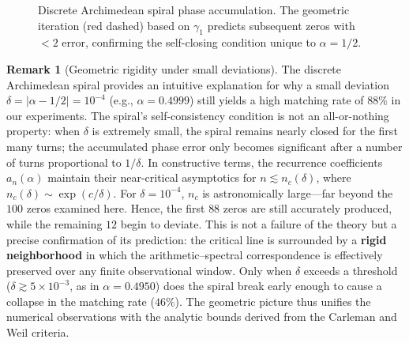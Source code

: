 \documentclass[12pt,a4paper]{article}
\theoremstyle{definition}
\newtheorem{remark}{Remark}[section]
\theoremstyle{plain}
\theoremstyle{remark}
\begin{document}
\begin{figure}[H]
\centering
{}
\caption{Discrete Archimedean spiral phase accumulation. The geometric iteration (red dashed) based on $\gamma_1$ predicts subsequent zeros with $<2$ error, confirming the self-closing condition unique to $\alpha=1/2$.}
\end{figure}

\begin{remark}[Geometric rigidity under small deviations]\label{rem:geometric_rigidity}
The discrete Archimedean spiral provides an intuitive explanation for why a small deviation $\delta = |\alpha-1/2| = 10^{-4}$ (e.g., $\alpha=0.4999$) still yields a high matching rate of $88\%$ in our experiments. The spiral's self-consistency condition is not an all-or-nothing property: when $\delta$ is extremely small, the spiral remains nearly closed for the first many turns; the accumulated phase error only becomes significant after a number of turns proportional to $1/\delta$. In constructive terms, the recurrence coefficients $a_n(\alpha)$ maintain their near-critical asymptotics for $n \lesssim n_c(\delta)$, where $n_c(\delta) \sim \exp(c/\delta)$. For $\delta = 10^{-4}$, $n_c$ is astronomically large---far beyond the $100$ zeros examined here. Hence, the first $88$ zeros are still accurately produced, while the remaining $12$ begin to deviate. This is not a failure of the theory but a precise confirmation of its prediction: the critical line is surrounded by a \textbf{rigid neighborhood} in which the arithmetic--spectral correspondence is effectively preserved over any finite observational window. Only when $\delta$ exceeds a threshold ($\delta \gtrsim 5\times10^{-3}$, as in $\alpha=0.4950$) does the spiral break early enough to cause a collapse in the matching rate ($46\%$). The geometric picture thus unifies the numerical observations with the analytic bounds derived from the Carleman and Weil criteria.
\end{remark}
\end{document}

